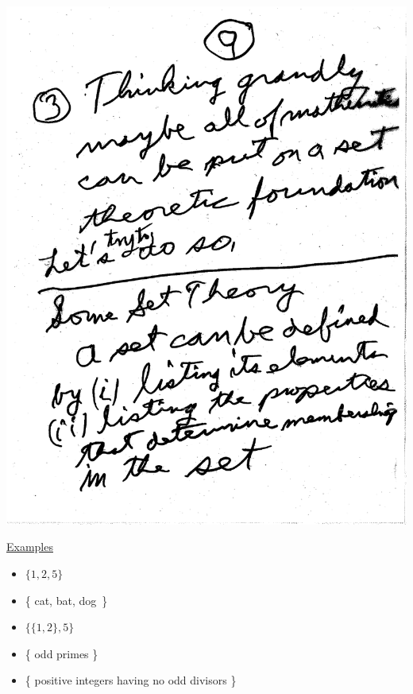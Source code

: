 \documentclass[10pt,a4paper]{article}
\begin{document}
{{\includegraphics[scale=.5]{Pages/ST_9}

\newpage 

\noindent \underline{Examples}

\vspace{2mm}
\begin{itemize}
\item $\{1,2,5\}$ 
\item \{ cat, bat, dog\ \}
\item $\{\{1,2\},5\}$
\item \{ odd primes \}
\item \{ positive integers having no odd divisors \}
\end{itemize}

}}
\end{document}
